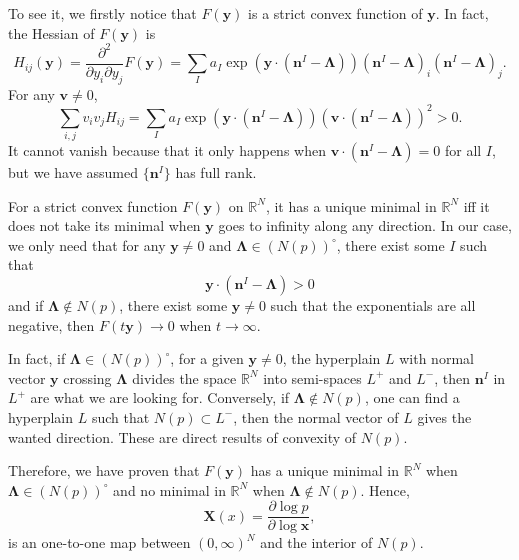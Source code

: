 \documentclass[12pt]{article}
\theoremstyle{definition}
\theoremstyle{plain}
\begin{document}
To see it, we firstly notice that $F(\mathbf y)$ is a strict convex function of $\mathbf y$. In fact, the Hessian of $F(\mathbf y)$ is 
\[
	H_{ij}(\mathbf y)=\frac{\partial^2}{\partial y_i\partial y_j}F(\mathbf y)=\sum_I a_I \exp\left(\mathbf{y}\cdot \left(\mathbf{n}^I-\mathbf{\Lambda}\right)\right)\left(\mathbf{n}^I-\mathbf{\Lambda}\right)_i\left(\mathbf{n}^I-\mathbf{\Lambda}\right)_j.
\]
For any $\mathbf v\neq 0$, 
\[
	\sum_{i,j}v_iv_jH_{ij}=\sum_I a_I \exp\left(\mathbf{y}\cdot \left(\mathbf{n}^I-\mathbf{\Lambda}\right)\right) \left(\mathbf v\cdot (\mathbf{n}^I-\mathbf{\Lambda})\right)^2 >0.
\]
It cannot vanish because that it only happens when $\mathbf v\cdot (\mathbf{n}^I-\mathbf{\Lambda})=0$ for all $I$, but we have assumed $\{\mathbf n^I\}$ has full rank.

For a strict convex function $F(\mathbf y)$ on $\mathbb R^N$, it has a unique minimal in $\mathbb R^N$ iff it does not take its minimal when $\mathbf{y}$ goes to infinity along any direction. In our case, we only need that for any $\mathbf{y}\neq 0$ and $\mathbf\Lambda \in (N(p))^\circ $, there exist some $I$ such that  
\[
	\mathbf{y}\cdot (\mathbf{n}^I-\mathbf{\Lambda})>0
\]
and if $\mathbf\Lambda \not\in N(p)$, there exist some $\mathbf{y}\neq 0$ such that the exponentials are all negative, then $F(t\mathbf y)\to 0$ when $t\to \infty$.

\iffalse
\begin{center}
	\texttt{[image: 1.png]}
\end{center}
\fi
In fact, if $\mathbf\Lambda \in (N(p))^\circ$, for a given $\mathbf y\neq 0$, the hyperplain $L$ with normal vector $\mathbf y$ crossing $\mathbf \Lambda$ divides the space $\mathbb R^N$ into semi-spaces $L^+$ and $L^-$, then $\mathbf{n}^I$ in $L^+$ are what we are looking for. Conversely, if $\mathbf\Lambda \not\in N(p)$, one can find a hyperplain $L$ such that $N(p)\subset L^-$, then the normal vector of $L$ gives the wanted direction. These are direct results of convexity of $N(p)$.

Therefore, we have proven that $F(\mathbf y)$ has a unique minimal in $\mathbb R^N$ when $\mathbf \Lambda \in (N(p))^\circ$ and no minimal in $\mathbb R^N$ when $\mathbf \Lambda \not\in N(p)$. Hence, 
\[
	\mathbf X(x)=\frac{\partial \log p}{\partial \log \mathbf x},
\]
is an one-to-one map between $(0,\infty)^N$ and the interior of $N(p)$.
\end{document}
